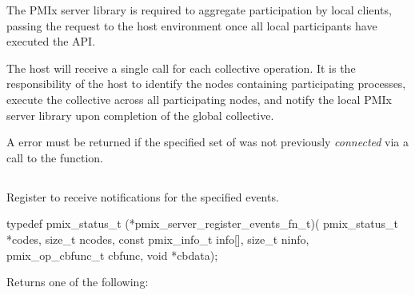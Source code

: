 \adviceimplstart
The \ac{PMIx} server library is required to aggregate participation by local clients, passing the request to the host environment once all local participants have executed the \ac{API}.
\adviceimplend

\advicermstart
The host will receive a single call for each collective operation. It is the responsibility of the host to identify the nodes containing participating processes, execute the collective across all participating nodes, and notify the local \ac{PMIx} server library upon completion of the global collective.

A  error must be returned if the specified set of  was not previously \textit{connected} via a call to the  function.
\advicermend


\subsection{}

\summary

Register to receive notifications for the specified events.

\format

\cspecificstart
\begin{codepar}
 typedef pmix_status_t (*pmix_server_register_events_fn_t)(
                              pmix_status_t *codes,
                              size_t ncodes,
                              const pmix_info_t info[],
                              size_t ninfo,
                              pmix_op_cbfunc_t cbfunc,
                              void *cbdata);
\end{codepar}
\cspecificend

\begin{arglist}
\end{arglist}

Returns one of the following:


